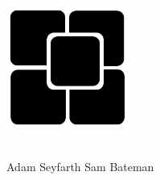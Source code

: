 \begin{titlepage}

\begin{center}

\includegraphics[width=0.3\textwidth]{../logo}\\[4.5cm]

{\LARGE

\fc \\[2.0cm]

Adam Seyfarth \hspace{3cm} Sam Bateman
}

\end{center}

\end{titlepage}
